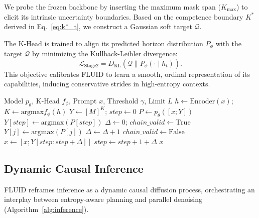 \documentclass[11pt]{article}
\begin{document}
We probe the frozen backbone by inserting the maximum mask span ($K_{\max}$) to elicit its intrinsic uncertainty boundaries. Based on the competence boundary $K^*$ derived in Eq.~\ref{eq:k*_t}, we construct a Gaussian soft target $\mathcal{Q}$.

The K-Head is trained to align its predicted horizon distribution $P_\phi$ with the target $\mathcal{Q}$ by minimizing the Kullback-Leibler divergence:
\begin{equation}
    \mathcal{L}_{\text{Stage2}} = D_{\text{KL}}\left( \mathcal{Q} \parallel P_\phi(\cdot \mid h_t) \right).
\end{equation}
This objective calibrates FLUID to learn a smooth, ordinal representation of its capabilities, inducing conservative strides in high-entropy contexts.
\begin{algorithm}[t]
\small %
\caption{Dynamic Causal Diffusion Inference}
\label{alg:inference}
\begin{algorithmic}[1]
\REQUIRE Model $p_\theta$, K-Head $f_\phi$, Prompt $x$, Threshold $\gamma$, Limit $L$
    \STATE $h \gets \text{Encoder}(x)$; \quad $K \gets \text{argmax} f_\phi(h)$ 
    \STATE $Y \gets [M]^K$; \quad $step \gets 0$
        \STATE $P \gets p_\theta([x; Y])$ 
        \STATE $Y[step] \gets \text{argmax}(P[step])$ 
        \STATE $\Delta \gets 0$; \quad $chain\_valid \gets \text{True}$
                \STATE $Y[j] \gets \text{argmax}(P[j])$ 
                \STATE $\Delta \gets \Delta + 1$
                \ENDIF
            \ELSE 
                \STATE $chain\_valid \gets \text{False}$
            \ENDIF
        \ENDFOR
        \STATE $x \gets [x; Y[step : step+\Delta]]$ 
        \STATE $step \gets step + 1 + \Delta$ 
    \ENDWHILE
\ENDWHILE
\RETURN $x$
\end{algorithmic}
\end{algorithm}
\subsection{Dynamic Causal Inference}
\label{ssec:inference}

FLUID reframes inference as a dynamic causal diffusion process, orchestrating an interplay between entropy-aware planning and parallel denoising (Algorithm~\ref{alg:inference}). 
\end{document}
